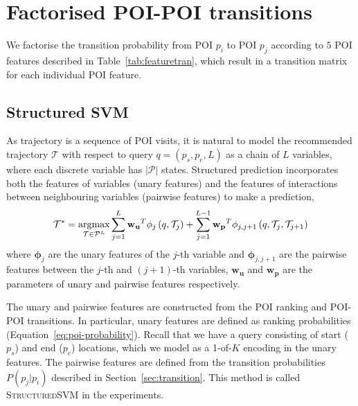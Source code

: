 \section{Factorised POI-POI transitions}

\label{appendix:transition}
We factorise the transition probability from POI $p_i$ to POI $p_j$
according to $5$ POI features described in Table~\ref{tab:featuretran},
which result in a transition matrix for each individual POI feature.


\subsection{Structured SVM}
\label{sec:ssvm}
\secmoveup

As trajectory is a sequence of POI visits,
it is natural to model the recommended trajectory $\mathcal{T}$ with respect to query $q = (p_s, p_e, L)$
as a chain of $L$ variables, where each discrete variable has $|\mathcal{P}|$ states.
Structured prediction incorporates both the features of variables (unary features) and
the features of interactions between neighbouring variables (pairwise features) to make a
prediction,
\begin{displaymath}
    \mathcal{T}^* = \operatorname*{argmax}_{\mathcal{T} \in \mathcal{P}^L} 
                    \sum_{j=1}^L \mathbf{w_u}^T \mathbf{\phi}_j \left( q, \mathcal{T}_j \right) +
                    \sum_{j=1}^{L-1} \mathbf{w_p}^T \mathbf{\phi}_{j, j+1} \left( q, \mathcal{T}_j, \mathcal{T}_{j+1} \right)
\end{displaymath}
where $\mathbf{\phi}_j$ are the unary features of the $j$-th variable and $\mathbf{\phi}_{j, j+1}$ are the pairwise features between
the $j$-th and $(j+1)$-th variables, $\mathbf{w_u}$ and $\mathbf{w_p}$ are the
parameters of unary and pairwise features respectively.

The unary and pairwise features are constructed from the POI ranking and POI-POI transitions.
In particular, unary features are defined as ranking probabilities (Equation~\ref{eq:poi-probability}).
Recall that we have a query consisting of start ($p_s$) and end ($p_e$) locations, which
we model as a 1-of-$K$ encoding in the unary features.
The pairwise features are defined from the transition probabilities $P(p_j | p_i)$ described in
Section~\ref{sec:transition}.
This method is called \textsc{StructuredSVM} in the experiments.

